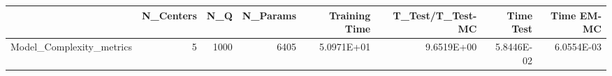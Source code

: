 \begin{tabular}{lrrrrrrr}
\toprule
{} &  N\_Centers &   N\_Q &  N\_Params &  Training Time &  T\_Test/T\_Test-MC &  Time Test &  Time EM-MC \\
\midrule
Model\_Complexity\_metrics &          5 &  1000 &      6405 &     5.0971E+01 &        9.6519E+00 & 5.8446E-02 &  6.0554E-03 \\
\bottomrule
\end{tabular}
